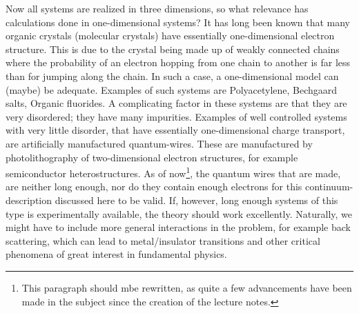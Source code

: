 Now all systems are realized in three dimensions, so what relevance has calculations done in one-dimensional systems?
It has long been known that many organic crystals (molecular crystals) have essentially one-dimensional electron structure. This is due to the crystal being made up of weakly connected chains where the probability of an electron hopping from one chain to another is far less than for jumping along the chain. In such a case, a one-dimensional model can (maybe) be adequate. Examples of such systems are Polyacetylene, Bechgaard salts, Organic fluorides. A complicating factor in these systems are that they are very disordered; they have many impurities.
Examples of well controlled systems with very little disorder, that have essentially one-dimensional charge transport, are artificially manufactured quantum-wires. These are manufactured by photolithography of two-dimensional electron structures, for example semiconductor heterostructures.
As of now\footnote{This paragraph should mbe rewritten, as quite a few advancements have been made in the subject since the creation of the lecture notes.}, the quantum wires that are made, are neither long enough, nor do they contain enough electrons for this continuum-description discussed here to be valid. If, however, long enough systems of this type is experimentally available, the theory should work excellently. Naturally, we might have to include more general interactions in the problem, for example back scattering, which can lead to metal/insulator transitions and other critical phenomena of great interest in fundamental physics.
